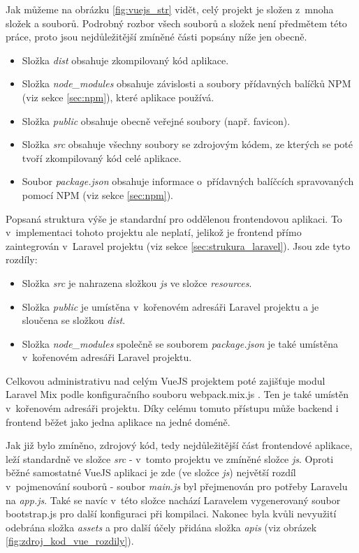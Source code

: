 	Jak můžeme na obrázku \ref{fig:vuejs_str} vidět, celý projekt je složen z~mnoha složek a souborů. Podrobný rozbor všech souborů a složek není předmětem této práce, proto jsou nejdůležitější zmíněné části popsány níže jen obecně.
	
	\begin{itemize}
		\item Složka \textit{dist} obsahuje zkompilovaný kód aplikace. \cite{FEDistFolder}
		\item Složka \textit{node\_modules} obsahuje závislosti a soubory přídavných balíčků NPM (viz sekce \ref{sec:npm}), které aplikace používá. \cite{VueJSFolder}
		\item Složka \textit{public} obsahuje obecně veřejné soubory (např. favicon). \cite{VueJSFolder}
		\item Složka \textit{src} obsahuje všechny soubory se zdrojovým kódem, ze kterých se poté tvoří zkompilovaný kód celé aplikace. \cite{VueJSFolder}
		\item Soubor \textit{package.json} obsahuje informace o~přídavných balíčcích spravovaných pomocí NPM (viz sekce \ref{sec:npm}). \cite{VueJSFolder}
	\end{itemize}
	
	Popsaná struktura výše je standardní pro oddělenou frontendovou aplikaci. To v~implementaci tohoto projektu ale neplatí, jelikož je frontend přímo zaintegrován v~Laravel projektu (viz sekce \ref{sec:strukura_laravel}). Jsou zde tyto rozdíly:
	
	\begin{itemize}
		\item Složka \textit{src} je nahrazena složkou \textit{js} ve složce \textit{resources}.
		\item Složka \textit{public} je umístěna v~kořenovém adresáři Laravel projektu a je sloučena se složkou \textit{dist}.
		\item Složka \textit{node\_modules} společně se souborem \textit{package.json} je také umístěna v~kořenovém adresáři Laravel projektu.
	\end{itemize}
	
	Celkovou administrativu nad celým VueJS projektem poté zajišťuje modul Laravel Mix podle konfiguračního souboru webpack.mix.js \cite{LaravelMixVue}. Ten je také umístěn v~kořenovém adresáři projektu. Díky celému tomuto přístupu může backend i frontend běžet jako jedna aplikace na jedné doméně.
	
	Jak již bylo zmíněno, zdrojový kód, tedy nejdůležitější část frontendové aplikace, leží standardně ve složce \textit{src} - v~tomto projektu ve zmíněné složce \textit{js}. Oproti běžné samostatné VueJS aplikaci je zde (ve složce \textit{js}) největší rozdíl v~pojmenování souborů - soubor \textit{main.js} byl přejmenován pro potřeby Laravelu na \textit{app.js}. Také se navíc v~této složce nachází Laravelem vygenerovaný soubor bootstrap.js pro další konfiguraci při kompilaci. Nakonec byla kvůli nevyužití odebrána složka \textit{assets} a pro další účely přidána složka \textit{apis} (viz obrázek \ref{fig:zdroj_kod_vue_rozdily}).
	
